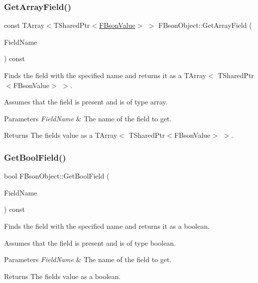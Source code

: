 \subsubsection{\texorpdfstring{Get\+Array\+Field()}{GetArrayField()}}
{\footnotesize\ttfamily const T\+Array$<$T\+Shared\+Ptr$<$\mbox{\hyperlink{class_f_bson_value}{F\+Bson\+Value}}$>$ $>$ F\+Bson\+Object\+::\+Get\+Array\+Field (\begin{DoxyParamCaption}\item[{const F\+String \&}]{Field\+Name }\end{DoxyParamCaption}) const}

Finds the field with the specified name and returns it as a T\+Array$<$ T\+Shared\+Ptr$<$\+F\+Bson\+Value$>$ $>$.

Assumes that the field is present and is of type array.


\begin{DoxyParams}{Parameters}
{\em Field\+Name} & The name of the field to get. \\
\hline
\end{DoxyParams}
\begin{DoxyReturn}{Returns}
The field\textquotesingle{}s value as a T\+Array$<$ T\+Shared\+Ptr$<$\+F\+Bson\+Value$>$ $>$. 
\end{DoxyReturn}
\mbox{\label{class_f_bson_object_a112736dc2fa79b11a1bd4f7c7bcb51ad}} 
\subsubsection{\texorpdfstring{Get\+Bool\+Field()}{GetBoolField()}}
{\footnotesize\ttfamily bool F\+Bson\+Object\+::\+Get\+Bool\+Field (\begin{DoxyParamCaption}\item[{const F\+String \&}]{Field\+Name }\end{DoxyParamCaption}) const}

Finds the field with the specified name and returns it as a boolean.

Assumes that the field is present and is of type boolean.


\begin{DoxyParams}{Parameters}
{\em Field\+Name} & The name of the field to get. \\
\hline
\end{DoxyParams}
\begin{DoxyReturn}{Returns}
The field\textquotesingle{}s value as a boolean. 
\end{DoxyReturn}
\mbox{\label{class_f_bson_object_af012a0438b3e430efed8dc4f1bcd1de7}} 
